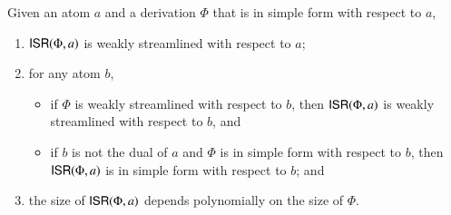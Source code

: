\begin{proposition}\label{proposition:IsolatedSubflowRemover}
Given an atom $a$ and a derivation $\Phi$ that is in simple form with respect to $a$,
\begin{enumerate}
\item $\mathsf{ISR}(\Phi,a)$ is weakly streamlined with respect to $a$;
\item for any atom $b$,
\begin{itemize}
\item if $\Phi$ is weakly streamlined with respect to $b$, then $\mathsf{ISR}(\Phi,a)$ is weakly streamlined with respect to $b$, and
\item if $b$ is not the dual of $a$ and $\Phi$ is in simple form with respect to $b$, then $\mathsf{ISR}(\Phi,a)$ is in simple form with respect to $b$; and
\end{itemize}
\item the size of\/ $\mathsf{ISR}(\Phi,a)$ depends polynomially on the size of\/ $\Phi$.
\end{enumerate}
\end{proposition}


